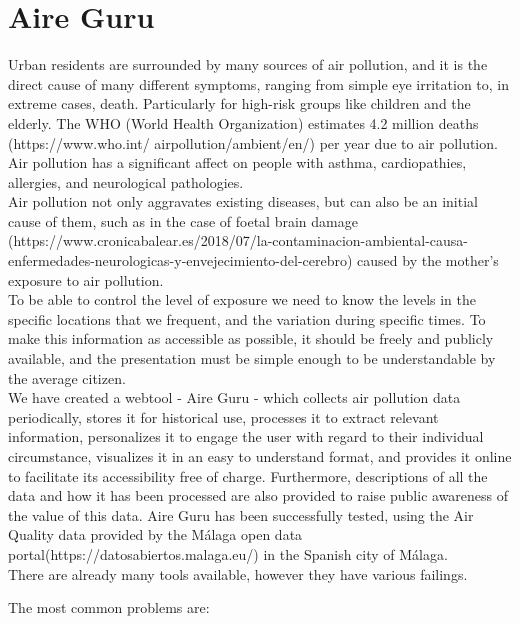 \section{Aire Guru}

Urban residents are surrounded by many sources of air pollution, and it is the direct cause of many different symptoms,
ranging from simple eye irritation 
to, in extreme cases, death. Particularly for high-risk groups like children and the elderly.
The WHO (World Health Organization) estimates 4.2 million deaths
(https://www.who.int/
airpollution/ambient/en/) per year due to air pollution.
Air pollution has a significant affect on people with asthma, cardiopathies, allergies, and neurological pathologies.\\

Air pollution not only aggravates existing diseases, but can also be an initial cause of them, such as in the case of foetal brain
damage (https://www.cronicabalear.es/2018/07/la-contaminacion-ambiental-causa-enfermedades-neurologicas-y-envejecimiento-del-cerebro)
caused by the mother's exposure to air pollution.\\

To be able to control the level of exposure we need to know the levels
in the specific locations that we frequent, and the variation during specific times.
To make this information as accessible as possible, it should be freely and publicly available, and the presentation
must be simple enough to be understandable by the average citizen.\\


We have created a webtool - Aire Guru - which collects air pollution data periodically, stores it for historical use, 
processes it to extract relevant information, personalizes it to engage the user with regard to their individual
circumstance, visualizes it in an easy to understand format, and provides it online to facilitate its accessibility free of charge. Furthermore,
descriptions of all the data and how it has been processed are also provided to raise public awareness of the value
of this data. Aire Guru has been successfully tested, using the Air Quality data provided
by the Málaga open data portal(https://datosabiertos.malaga.eu/) in the Spanish city of Málaga.\\

There are already many tools available, however they have various failings.

The most common problems are:

